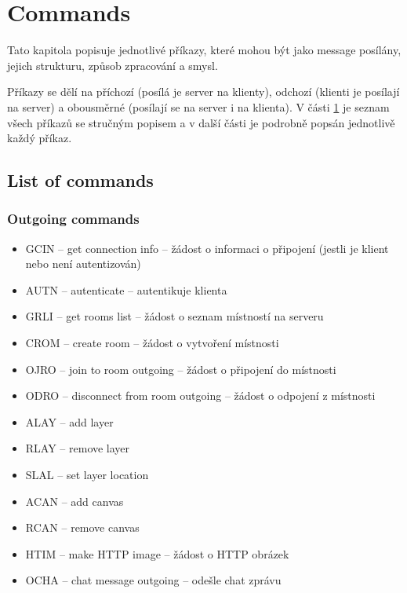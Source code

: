 \part{Commands}
\label{commands}

Tato kapitola popisuje jednotlivé příkazy, které mohou být jako message posílány, jejich strukturu, způsob zpracování a smysl.

Příkazy se dělí na příchozí (posílá je server na klienty), odchozí (klienti je posílají na server) a obousměrné (posílají se na server i na klienta). V části \ref{commands.list_of_commands} je seznam všech příkazů se stručným popisem a v další části je podrobně popsán jednotlivě každý příkaz.

\chapter{List of commands}
\label{commands.list_of_commands}

\section{Outgoing commands}

\begin{itemize}
    \item GCIN -- get connection info -- žádost o informaci o připojení (jestli je klient nebo není autentizován)
    \item AUTN -- autenticate -- autentikuje klienta
    \item GRLI -- get rooms list -- žádost o seznam místností na serveru
    \item CROM -- create room -- žádost o vytvoření místnosti
    \item OJRO -- join to room outgoing -- žádost o připojení do místnosti
    \item ODRO -- disconnect from room outgoing -- žádost o odpojení z místnosti
    \item ALAY -- add layer
    \item RLAY -- remove layer
    \item SLAL -- set layer location
    \item ACAN -- add canvas
    \item RCAN -- remove canvas
	\item HTIM -- make HTTP image -- žádost o HTTP obrázek
	\item OCHA -- chat message outgoing -- odešle chat zprávu
\end{itemize}

